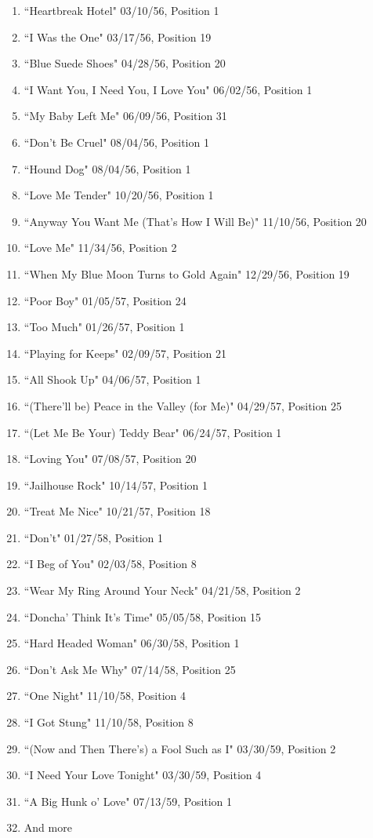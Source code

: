 \documentclass[12pt, a4paper, twoside, openright, titlepage]{book}
\begin{document}
\begin{enumerate}
    \item ``Heartbreak Hotel" 03/10/56, Position 1
    \item ``I Was the One" 03/17/56, Position 19
    \item ``Blue Suede Shoes" 04/28/56, Position 20
    \item ``I Want You, I Need You, I Love You" 06/02/56, Position 1
    \item ``My Baby Left Me" 06/09/56, Position 31
    \item ``Don't Be Cruel" 08/04/56, Position 1
    \item ``Hound Dog" 08/04/56, Position 1
    \item ``Love Me Tender" 10/20/56, Position 1
    \item ``Anyway You Want Me (That's How I Will Be)" 11/10/56, Position 20
    \item ``Love Me" 11/34/56, Position 2
    \item ``When My Blue Moon Turns to Gold Again" 12/29/56, Position 19
    \item ``Poor Boy" 01/05/57, Position 24
    \item ``Too Much" 01/26/57, Position 1
    \item ``Playing for Keeps" 02/09/57, Position 21
    \item ``All Shook Up" 04/06/57, Position 1
    \item ``(There'll be) Peace in the Valley (for Me)" 04/29/57, Position 25
    \item ``(Let Me Be Your) Teddy Bear" 06/24/57, Position 1
    \item ``Loving You" 07/08/57, Position 20
    \item ``Jailhouse Rock" 10/14/57, Position 1
    \item ``Treat Me Nice" 10/21/57, Position 18
    \item ``Don't" 01/27/58, Position 1
    \item ``I Beg of You" 02/03/58, Position 8
    \item ``Wear My Ring Around Your Neck" 04/21/58, Position 2
    \item ``Doncha' Think It's Time" 05/05/58, Position 15
    \item ``Hard Headed Woman" 06/30/58, Position 1
    \item ``Don't Ask Me Why" 07/14/58, Position 25
    \item ``One Night" 11/10/58, Position 4
    \item ``I Got Stung" 11/10/58, Position 8
    \item ``(Now and Then There's) a Fool Such as I" 03/30/59, Position 2
    \item ``I Need Your Love Tonight" 03/30/59, Position 4
    \item ``A Big Hunk o' Love" 07/13/59, Position 1
    \item And more
\end{enumerate}
\end{document}
